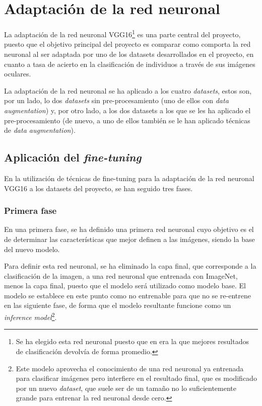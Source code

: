 \section{Adaptación de la red neuronal}

La adaptación de la red neuronal VGG16\footnote{Se ha elegido esta red neuronal puesto que en \cite{tfg_iris_2020} era la que mejores resultados de clasificación devolvía de forma promedio.} es una parte central del proyecto, puesto que el objetivo principal del proyecto es comparar como comporta la red neuronal al ser adaptada por uno de los datasets desarrollados en el proyecto, en cuanto a tasa de acierto en la clasificación de individuos a través de sus imágenes oculares. 

La adaptación de la red neuronal se ha aplicado a los cuatro \textit{datasets}, estos son, por un lado, lo dos \textit{datasets} sin pre-procesamiento (uno de ellos con \textit{data augmentation}) y, por otro lado, a los dos datasets a los que se les ha aplicado el pre-procesamiento (de nuevo, a uno de ellos también se le han aplicado técnicas de \textit{data augmentation}). 
\subsection{Aplicación del \textit{fine-tuning}}

En la  utilización de técnicas de fine-tuning para la adaptación de la red neuronal VGG16 a los datasets del proyecto, se han seguido tres fases. 

\subsubsection{Primera fase}
En una primera fase, se ha definido una primera red neuronal cuyo objetivo es el de determinar las características que mejor definen a las imágenes, siendo la base del nuevo modelo. 

Para definir esta red neuronal, se ha eliminado la capa final, que corresponde a la clasificación de la imagen, a una red neuronal que entrenada con ImageNet, menos la capa final, puesto que el modelo será utilizado como modelo base. El modelo se establece en este punto como no entrenable para que no se re-entrene en las siguiente fase, de forma que el modelo resultante funcione como un \textit{inference model}\footnote{Este modelo aprovecha el conocimiento de una red neuronal ya entrenada para clasificar imágenes pero interfiere en el resultado final, que es modificado por un nuevo \textit{dataset}, que suele ser de un tamaño no lo suficientemente grande para entrenar la red neuronal desde cero.}. 

